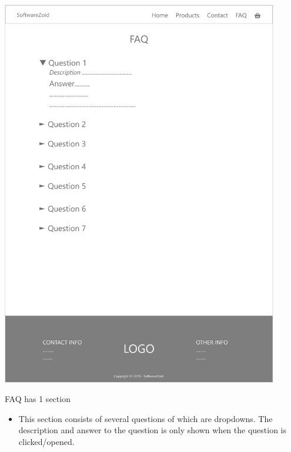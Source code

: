 \documentclass[11pt]{report}
\begin{document}
\begin{center}
\includegraphics[height=17cm]{page4}
\end{center}
\noindent FAQ has 1 section
\begin{itemize}
  \item This section consists of several questions of which are dropdowns. The description and answer to the question is only shown when the question is clicked/opened.
\end{itemize}
\end{document}
